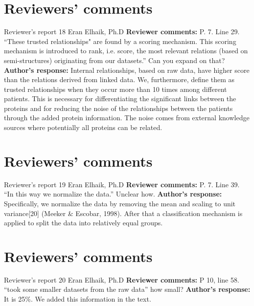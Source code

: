 \documentclass{bmcart}
\begin{document}
\begin{backmatter}
\section*{Reviewers' comments}
\newline Reviewer's report 18
\newline Eran Elhaik, Ph.D
\newline \textbf{Reviewer comments:}
P. 7. Line 29. “These trusted relationships" are found by a scoring mechanism. This scoring mechanism is introduced to rank, i.e. score, the most relevant relations (based on semi-structures) originating from our datasets.” Can you expand on that?
\newline \textbf{Author's response:}
Internal relationships, based on raw data, have higher score than the relations derived from linked data. We, furthermore, define them as trusted relationships when they occur more than 10 times among different patients. This is necessary for differentiating the significant links between the proteins and for reducing the noise of the relationships between the patients through the added protein information. The noise comes from external knowledge sources where potentially all proteins can be related.

\section*{Reviewers' comments}
\newline Reviewer's report 19
\newline Eran Elhaik, Ph.D
\newline \textbf{Reviewer comments:}
P. 7. Line 39. “In this way we normalize the data.” Unclear how.
\newline \textbf{Author's response:}
Specifically, we normalize the data by removing the mean and scaling to unit variance[20] (Meeker & Escobar, 1998). After that a classification mechanism is applied to split the data into relatively equal groups.

\section*{Reviewers' comments}
\newline Reviewer's report 20
\newline Eran Elhaik, Ph.D
\newline \textbf{Reviewer comments:}
P 10, line 58. “took some smaller datasets from the raw data” how small?
\newline \textbf{Author's response:}
It is 25\%. We added this information in the text.


\end{backmatter}
\end{document}
